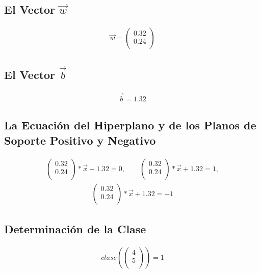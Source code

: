 \documentclass[fleqn]{llncs}
\begin{document}
\subsection{El Vector $\overrightarrow{w}$}
\begin{align*}
	\overrightarrow{w} =
	\begin{pmatrix}
		0.32 \\
		0.24 \\
	\end{pmatrix}
\end{align*}

\subsection{El Vector $\overrightarrow{b}$}
\begin{align*}
	\overrightarrow{b} = 1.32
\end{align*}

\subsection{La Ecuación del Hiperplano y de los Planos de Soporte Positivo y Negativo}
\begin{align*}
	\begin{pmatrix}
		0.32 \\
		0.24 \\
	\end{pmatrix} * \overrightarrow{x} + 1.32 = 0,
	\qquad
	\begin{pmatrix}
		0.32 \\
		0.24 \\
	\end{pmatrix} * \overrightarrow{x} + 1.32 = 1,
\end{align*}
\begin{align*}
	\begin{pmatrix}
		0.32 \\
		0.24 \\
	\end{pmatrix} * \overrightarrow{x} + 1.32 = -1
\end{align*}

\subsection{Determinación de la Clase}
\begin{align*}
	clase \left(
	\begin{pmatrix}
		4 \\
		5 \\
	\end{pmatrix} \right) = 1
\end{align*}
\end{document}
